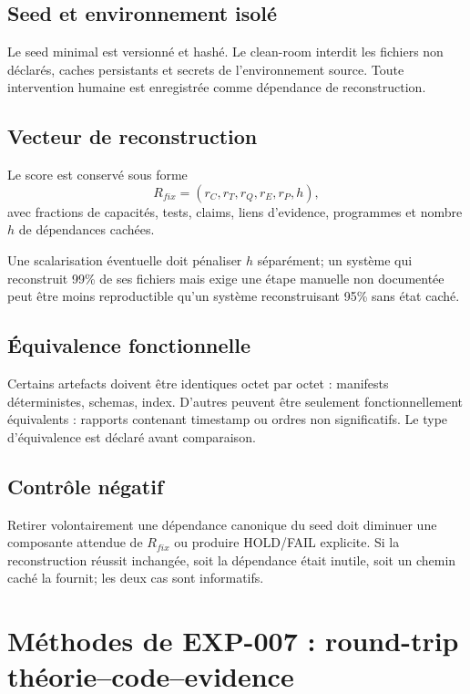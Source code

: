 \section{Seed et environnement isolé}

Le seed minimal est versionné et hashé. Le clean-room interdit les fichiers non déclarés, caches persistants et secrets de l'environnement source. Toute intervention humaine est enregistrée comme dépendance de reconstruction.

\section{Vecteur de reconstruction}

Le score est conservé sous forme
\[
R_{fix}=(r_C,r_T,r_Q,r_E,r_P,h),
\]
avec fractions de capacités, tests, claims, liens d'evidence, programmes et nombre $h$ de dépendances cachées.

Une scalarisation éventuelle doit pénaliser $h$ séparément; un système qui reconstruit 99\% de ses fichiers mais exige une étape manuelle non documentée peut être moins reproductible qu'un système reconstruisant 95\% sans état caché.

\section{Équivalence fonctionnelle}

Certains artefacts doivent être identiques octet par octet : manifests déterministes, schemas, index. D'autres peuvent être seulement fonctionnellement équivalents : rapports contenant timestamp ou ordres non significatifs. Le type d'équivalence est déclaré avant comparaison.

\section{Contrôle négatif}

Retirer volontairement une dépendance canonique du seed doit diminuer une composante attendue de $R_{fix}$ ou produire HOLD/FAIL explicite. Si la reconstruction réussit inchangée, soit la dépendance était inutile, soit un chemin caché la fournit; les deux cas sont informatifs.

\chapter{Méthodes de EXP-007 : round-trip théorie--code--evidence}

